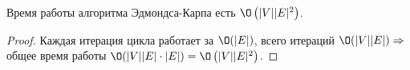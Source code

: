 \Cons Время работы алгоритма Эдмондса-Карпа есть $\O\left(|V| |E|^2\right)$.
\begin{proof}
    
    Каждая итерация цикла работает за $\O(|E|)$, всего итераций $\O(|V| |E|) \Rightarrow$ общее время работы $\O(|V| |E| \cdot |E|) = \O\left(|V| |E|^2\right)$.

\end{proof}
